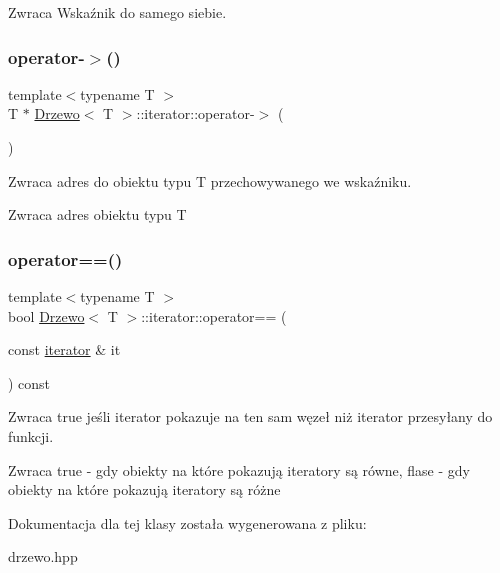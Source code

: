 \begin{DoxyReturn}{Zwraca}
Wskaźnik do samego siebie. 
\end{DoxyReturn}
\mbox{\label{class_drzewo_1_1iterator_ac982660e25eb9720b5c81b6ccff0559e}} 
\subsubsection{\texorpdfstring{operator-\/$>$()}{operator->()}}
{\footnotesize\ttfamily template$<$typename T $>$ \\
T $\ast$ \hyperlink{class_drzewo}{Drzewo}$<$ T $>$\+::iterator\+::operator-\/$>$ (\begin{DoxyParamCaption}{ }\end{DoxyParamCaption})\hspace{0.3cm}{\ttfamily [inline]}}

Zwraca adres do obiektu typu T przechowywanego we wskaźniku.

\begin{DoxyReturn}{Zwraca}
adres obiektu typu T 
\end{DoxyReturn}
\mbox{\label{class_drzewo_1_1iterator_ab701b082f0d712968b2fa1d45e3595a8}} 
\subsubsection{\texorpdfstring{operator==()}{operator==()}}
{\footnotesize\ttfamily template$<$typename T $>$ \\
bool \hyperlink{class_drzewo}{Drzewo}$<$ T $>$\+::iterator\+::operator== (\begin{DoxyParamCaption}\item[{const \hyperlink{class_drzewo_1_1iterator}{iterator} \&}]{it }\end{DoxyParamCaption}) const\hspace{0.3cm}{\ttfamily [inline]}}

Zwraca \textquotesingle{}true\textquotesingle{} jeśli iterator pokazuje na ten sam węzeł niż iterator przesyłany do funkcji.

\begin{DoxyReturn}{Zwraca}
true -\/ gdy obiekty na które pokazują iteratory są równe, flase -\/ gdy obiekty na które pokazują iteratory są różne 
\end{DoxyReturn}


Dokumentacja dla tej klasy została wygenerowana z pliku\+:\begin{DoxyCompactItemize}
\item 
drzewo.\+hpp\end{DoxyCompactItemize}
